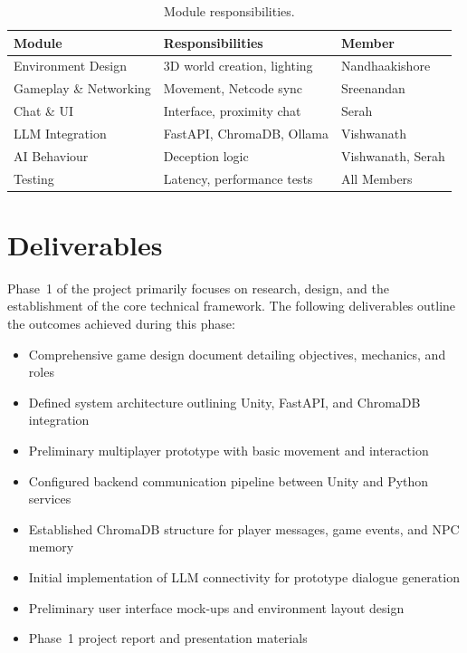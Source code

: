 \begin{table}[H]
\centering
\begin{tabular}{|p{3cm}|p{5.5cm}|p{3cm}|}
\hline
\textbf{Module} & \textbf{Responsibilities} & \textbf{Member} \\ \hline
Environment Design   & 3D world creation, lighting              & Nandhaakishore \\ \hline
Gameplay \& Networking & Movement, Netcode sync~\cite{barri2016} & Sreenandan \\ \hline
Chat \& UI           & Interface, proximity chat                & Serah \\ \hline
LLM Integration      & FastAPI, ChromaDB, Ollama                & Vishwanath \\ \hline
AI Behaviour         & Deception logic~\cite{zeng2023}          & Vishwanath, Serah \\ \hline
Testing              & Latency, performance tests~\cite{raith2021} & All Members \\ \hline
\end{tabular}
\caption{Module responsibilities.}
\label{tab:modules}
\end{table}

\section{Deliverables}

Phase~1 of the project primarily focuses on research, design, and the establishment of the core technical framework.
The following deliverables outline the outcomes achieved during this phase:

\begin{itemize}
    \item Comprehensive game design document detailing objectives, mechanics, and roles
    \item Defined system architecture outlining Unity, FastAPI, and ChromaDB integration
    \item Preliminary multiplayer prototype with basic movement and interaction
    \item Configured backend communication pipeline between Unity and Python services
    \item Established ChromaDB structure for player messages, game events, and NPC memory
    \item Initial implementation of LLM connectivity for prototype dialogue generation
    \item Preliminary user interface mock-ups and environment layout design
    \item Phase~1 project report and presentation materials
\end{itemize}

